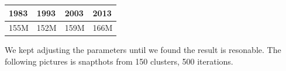 \begin{table}
    \centering
    \label{4year}
    \begin{tabular}{|l|l|l|l|}
        \hline
        1983 & 1993 & 2003 & 2013 \\
        \hline
        155M & 152M & 159M & 166M \\
        \hline
    \end{tabular}
\end{table}

We kept adjusting the parameters until we found the result is resonable. The following pictures is snapthots from 150 clusters, 500 iterations.

